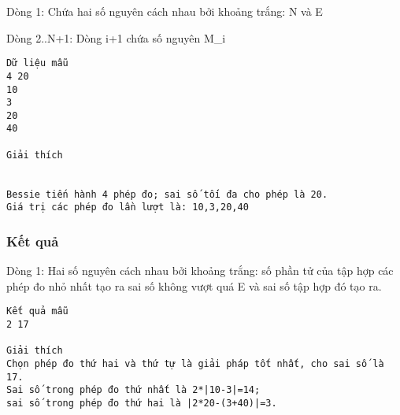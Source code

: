    Dòng 1: Chứa hai số nguyên cách nhau bởi khoảng trắng: N và E  

   Dòng 2..N+1: Dòng i+1 chứa số nguyên M\_i  
\begin{verbatim}
Dữ liệu mẫu
4 20
10
3
20
40

Giải thích


Bessie tiến hành 4 phép đo; sai số tối đa cho phép là 20. 
Giá trị các phép đo lần lượt là: 10,3,20,40
\end{verbatim}

\subsubsection{   Kết quả  }

   Dòng 1: Hai số nguyên cách nhau bởi khoảng trắng: số phần tử của tập hợp các phép đo nhỏ nhất tạo ra sai số không vượt quá E và sai số tập hợp đó tạo ra.  
\begin{verbatim}
Kết quả mẫu
2 17

Giải thích
Chọn phép đo thứ hai và thứ tự là giải pháp tốt nhất, cho sai số là 17. 
Sai số trong phép đo thứ nhất là 2*|10-3|=14; 
sai số trong phép đo thứ hai là |2*20-(3+40)|=3.
\end{verbatim}
